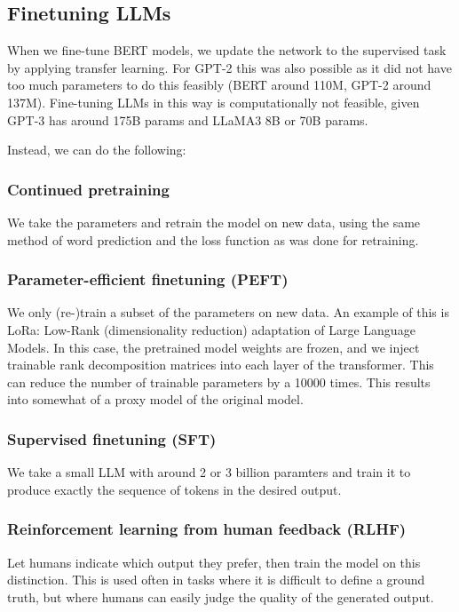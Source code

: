 \subsection{Finetuning LLMs}

When we fine-tune BERT models, we update the network to the supervised
task by applying transfer learning. For GPT-2 this was also possible as
it did not have too much parameters to do this feasibly (BERT around
110M, GPT-2 around 137M).
Fine-tuning LLMs in this way is computationally not feasible, given
GPT-3 has around 175B params
and LLaMA3 8B or 70B params.

Instead, we can do the following:

\subsubsection{Continued pretraining}

We take the parameters and retrain the model on new data, using the same
method of word prediction and the loss function as was done for retraining.

\subsubsection{Parameter-efficient finetuning (PEFT)}

We only (re-)train a subset of the parameters on new data. An example of this is
LoRa: Low-Rank (dimensionality reduction) adaptation of Large
Language Models. In this case, the pretrained
model weights are frozen, and we inject trainable rank decomposition matrices
into each layer of the transformer. This can reduce the number of
trainable parameters
by a 10000 times. This results into somewhat of a proxy model of the
original model.

\subsubsection{Supervised finetuning (SFT)}

We take a small LLM with around 2 or 3 billion paramters and train
it to produce exactly the sequence of tokens in the desired output.

\subsubsection{Reinforcement learning from human feedback (RLHF)}

Let humans indicate which output they prefer, then train the model
on this distinction. This is used often in tasks where it is difficult to define
a ground truth, but where humans can easily judge the quality of the
generated output.

